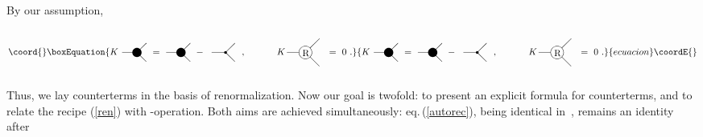 \documentclass[a4paper,12pt]{article}
\begin{document}
By our assumption,
\begin{equation}\coord{}\boxEquation{
\label{K1}
K
\parbox{1.2cm}{
\begin{picture}(30,60)
\put(20,30){\circle*{10}}
\put(4,30){\line(1,0){15}}
\put(20,30){\line(1,1){10}}
\put(20,30){\line(1,-1){10}}
\end{picture}
} =
\parbox{1.2cm}{
\begin{picture}(30,60)
\put(20,30){\circle*{10}}
\put(4,30){\line(1,0){15}}
\put(20,30){\line(1,1){10}}
\put(20,30){\line(1,-1){10}}
\end{picture}
} - \,
\parbox{1.2cm}{
\begin{picture}(30,60)
\put(20,30){\circle*{3}}
\put(5,30){\line(1,0){15}}
\put(20,30){\line(1,1){10}}
\put(20,30){\line(1,-1){10}}
\end{picture}
}\ , \ \ \ \ \ \ \ \ \ \
K \,
\parbox{1.5cm}{
\begin{picture}(35,60)
\put(20,30){\circle{14}}
\put(0,30){\line(1,0){13}}
\put(25,35){\line(1,1){10}}
\put(25,25){\line(1,-1){10}}
\put(16.7,26){R}
\end{picture}
} = \ 0\ .
}{
K
\parbox{1.2cm}{
\begin{picture}(30,60)
\put(20,30){\circle*{10}}
\put(4,30){\line(1,0){15}}
\put(20,30){\line(1,1){10}}
\put(20,30){\line(1,-1){10}}
\end{picture}
} =
\parbox{1.2cm}{
\begin{picture}(30,60)
\put(20,30){\circle*{10}}
\put(4,30){\line(1,0){15}}
\put(20,30){\line(1,1){10}}
\put(20,30){\line(1,-1){10}}
\end{picture}
} - \,
\parbox{1.2cm}{
\begin{picture}(30,60)
\put(20,30){\circle*{3}}
\put(5,30){\line(1,0){15}}
\put(20,30){\line(1,1){10}}
\put(20,30){\line(1,-1){10}}
\end{picture}
}\ , \ \ \ \ \ \ \ \ \ \
K \,
\parbox{1.5cm}{
\begin{picture}(35,60)
\put(20,30){\circle{14}}
\put(0,30){\line(1,0){13}}
\put(25,35){\line(1,1){10}}
\put(25,25){\line(1,-1){10}}
\put(16.7,26){R}
\end{picture}
} = \ 0\ .
}{ecuacion}\coordE{}\end{equation}
Thus, we lay counterterms in the basis of renormalization.
Now our goal is twofold: to present an explicit formula for counterterms,
and to relate the recipe (\ref{ren}) with \myHighlight{$R$}\coordHE{}-operation.
Both aims are achieved simultaneously: eq.\,(\ref{autorec}),
being identical in \myHighlight{$g$}\coordHE{}\,, remains an identity after
\end{document}
